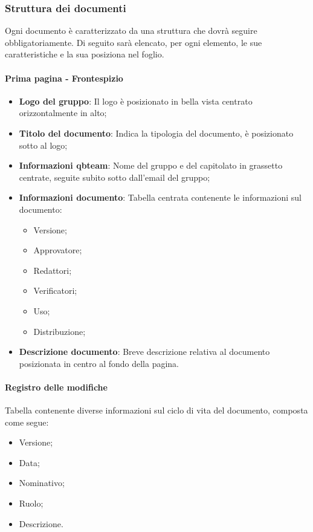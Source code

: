 \subsubsection{Struttura dei documenti}
Ogni documento è caratterizzato da una struttura che dovrà seguire obbligatoriamente.
Di seguito sarà elencato, per ogni elemento, le sue caratteristiche e la sua posiziona nel foglio.

\paragraph{Prima pagina - Frontespizio} 
\begin{itemize}
\item \textbf{Logo del gruppo}: Il logo è posizionato in bella vista centrato orizzontalmente in alto;
\item \textbf{Titolo del documento}: Indica la tipologia del documento, è posizionato sotto al logo;
\item \textbf{Informazioni qbteam}: Nome del gruppo e del capitolato in grassetto centrate, seguite subito sotto dall'email del gruppo; 
\item \textbf{Informazioni documento}: Tabella centrata contenente le informazioni sul documento:
\begin{itemize}
\item Versione;
\item Approvatore;
\item Redattori;
\item Verificatori;
\item Uso;
\item Distribuzione;
\end{itemize}
\item \textbf{Descrizione documento}: Breve descrizione relativa al documento posizionata in centro al fondo della pagina.
\end{itemize}

\paragraph{Registro delle modifiche} 
Tabella contenente diverse informazioni sul ciclo di vita del documento, composta come segue:
\begin{itemize}
\item Versione;
\item Data;
\item Nominativo;
\item Ruolo;
\item Descrizione.
\end{itemize}

